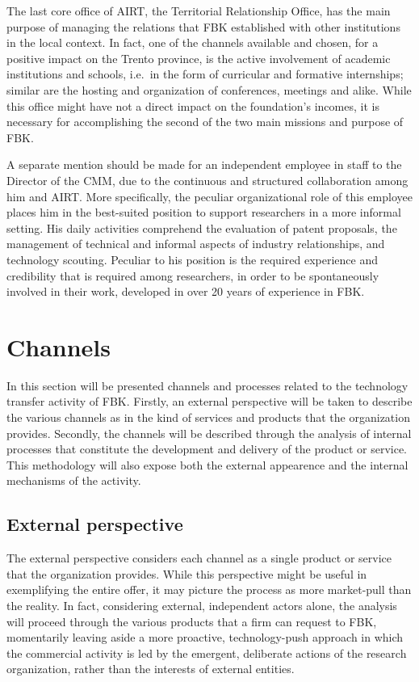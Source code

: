 The last core office of AIRT, the Territorial Relationship Office, has the main purpose of managing the relations that FBK established with other institutions in the local context. In fact, one of the channels available and chosen, for a positive impact on the Trento province, is the active involvement of academic institutions and schools, i.e.\ in the form of curricular and formative internships; similar are the hosting and organization of conferences, meetings and alike. While this office might have not a direct impact on the foundation's incomes, it is necessary for accomplishing the second of the two main missions and purpose of FBK.

A separate mention should be made for an independent employee in staff to the Director of the CMM, due to the continuous and structured collaboration among him and AIRT. More specifically, the peculiar organizational role of this employee places him in the best-suited position to support researchers in a more informal setting. His daily activities comprehend the evaluation of patent proposals, the management of technical and informal aspects of industry relationships, and technology scouting. Peculiar to his position is the required experience and credibility that is required among researchers, in order to be spontaneously involved in their work, developed in over 20 years of experience in FBK.

\section{Channels}

In this section will be presented channels and processes related to the technology transfer activity of FBK. Firstly, an external perspective will be taken to describe the various channels as in the kind of services and products that the organization provides. Secondly, the channels will be described through the analysis of internal processes that constitute the development and delivery of the product or service. This methodology will also expose both the external appearence and the internal mechanisms of the activity. 

\subsection{External perspective}

The external perspective considers each channel as a single product or service that the organization provides. While this perspective might be useful in exemplifying the entire offer, it may picture the process as more market-pull than the reality. In fact, considering external, independent actors alone, the analysis will proceed through the various products that a firm can request to FBK, momentarily leaving aside a more proactive, technology-push approach in which the commercial activity is led by the emergent, deliberate actions of the research organization, rather than the interests of external entities.

